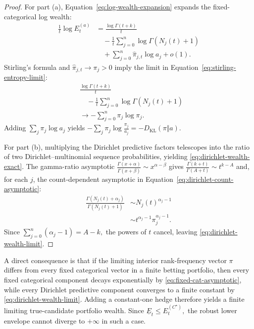 \begin{proof}
For part (a), Equation~\eqref{eq:log-wealth-expansion} expands the fixed-categorical log wealth:
\begin{equation}
\begin{aligned}
  \frac1t\log E_t^{(a)}
  &=
  \frac{\log\Gamma(t+k)}{t}\\
  &\quad-
  \frac1t\sum_{j=0}^n\log\Gamma(N_j(t)+1)\\
  &\quad+
  \sum_{j=0}^n\widehat\pi_{j,t}\log a_j
  +o(1).
\end{aligned}
  \label{eq:log-wealth-expansion}
\end{equation}
Stirling's formula and \(\widehat\pi_{j,t}\to\pi_j>0\) imply the limit in Equation~\eqref{eq:stirling-entropy-limit}:
\begin{equation}
\begin{aligned}
&\frac{\log\Gamma(t+k)}{t}\\
&\quad-\frac1t\sum_{j=0}^n\log\Gamma(N_j(t)+1)\\
&\longrightarrow -\sum_{j=0}^n\pi_j\log\pi_j.
\end{aligned}
\label{eq:stirling-entropy-limit}
\end{equation}
Adding \(\sum_j\pi_j\log a_j\) yields
\(-\sum_j\pi_j\log\frac{\pi_j}{a_j} = -D_{\mathrm{KL}}(\pi\Vert a).\)

For part (b), multiplying the Dirichlet predictive factors telescopes into the ratio of two Dirichlet--multinomial sequence probabilities, yielding \eqref{eq:dirichlet-wealth-exact}. The gamma-ratio asymptotic
\(\frac{\Gamma(x+\alpha)}{\Gamma(x+\beta)} \sim x^{\alpha-\beta}\)
gives
\(\frac{\Gamma(k+t)}{\Gamma(A+t)} \sim t^{k-A}\)
and, for each \(j\), the count-dependent asymptotic in Equation~\eqref{eq:dirichlet-count-asymptotic}:
\begin{equation}
\begin{aligned}
\frac{\Gamma(N_j(t)+\alpha_j)}
     {\Gamma(N_j(t)+1)}
&\sim N_j(t)^{\alpha_j-1}\\
&\sim t^{\alpha_j-1}\pi_j^{\alpha_j-1}.
\end{aligned}
\label{eq:dirichlet-count-asymptotic}
\end{equation}
Since
\(\sum_{j=0}^n(\alpha_j-1)=A-k,\)
the powers of \(t\) cancel, leaving \eqref{eq:dirichlet-wealth-limit}.
\end{proof}

A direct consequence is that if the limiting interior rank-frequency vector \(\pi\) differs from every fixed categorical vector in a finite betting portfolio, then every fixed categorical component decays exponentially by \eqref{eq:fixed-cat-asymptotic}, while every Dirichlet predictive component converges to a finite constant by \eqref{eq:dirichlet-wealth-limit}. Adding a constant-one hedge therefore yields a finite limiting true-candidate portfolio wealth. Since
\(\underline E_t\le E_t^{(C^\star)},\)
the robust lower envelope cannot diverge to \(+\infty\) in such a case.

